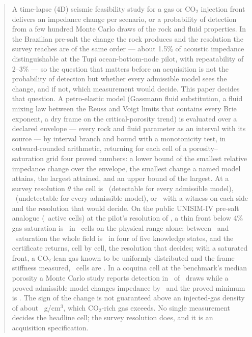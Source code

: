 \documentclass[preprint,11pt,authoryear]{elsarticle}
\begin{document}
\begin{frontmatter}
\begin{abstract}
A time-lapse (4D) seismic feasibility study for a gas or CO$_2$ injection front delivers an impedance change per scenario, or a probability of detection from a few hundred Monte Carlo draws of the rock and fluid properties. In the Brazilian pre-salt the change the rock produces and the resolution the survey reaches are of the same order --- about 1.5\% of acoustic impedance distinguishable at the Tupi ocean-bottom-node pilot, with repeatability of 2--3\% --- so the question that matters before an acquisition is not the probability of detection but whether every admissible model sees the change, and if not, which measurement would decide. This paper decides that question. A petro-elastic model (Gassmann fluid substitution, a fluid mixing law between the Reuss and Voigt limits that contains every Brie exponent, a dry frame on the critical-porosity trend) is evaluated over a declared envelope --- every rock and fluid parameter as an interval with its source --- by interval branch and bound with a monotonicity test, in outward-rounded arithmetic, returning for each cell of a porosity--saturation grid four proved numbers: a lower bound of the smallest relative impedance change over the envelope, the smallest change a named model attains, the largest attained, and an upper bound of the largest. At a survey resolution $\theta$ the cell is \vProved\ (detectable for every admissible model), \vRefuted\ (undetectable for every admissible model), or \vRefused\ with a witness on each side and the resolution that would decide. On the public UNISIM-IV pre-salt analogue (\DActive\ active cells) at the pilot's resolution of \DTheta, a thin front below 4\% gas saturation is \vRefuted\ in \DThinRefutedZero\ cells on the physical range alone; between \DMidSgLo\ and \DMidSgHi\ saturation the whole field is \vRefused\ in four of five knowledge states, and the certificate returns, cell by cell, the resolution that decides; with a saturated front, a CO$_2$-lean gas known to be uniformly distributed and the frame stiffness measured, \DDetFour\ cells are \vProved. In a coquina cell at the benchmark's median porosity a Monte Carlo study reports detection in \DMcFourTenKP\ of \DMcFourTenKDraws\ draws while a proved admissible model changes impedance by \DKFourAttLo\ and the proved minimum is \DKFourProvedLo. The sign of the change is not guaranteed above an injected-gas density of about \DSignMedian\ g/cm$^3$, which CO$_2$-rich gas exceeds. No single measurement decides the headline cell; the survey resolution does, and it is an acquisition specification.
\end{abstract}


\end{frontmatter}
\end{document}
